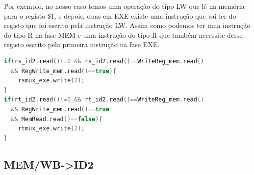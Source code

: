 \documentclass[pdftex,12pt,a4paper]{report}
\begin{document}
Por exemplo, no nosso caso temos uma operação do tipo LW que lê na memória para o registo \$1, e depois, duas em EXE existe uma instrução que vai ler do registo que foi escrito pela instrução LW. Assim como podemos ter uma instrução do tipo R na fase MEM e uma instrução do tipo R que também necessite desse registo escrito pela primeira instrução na fase EXE. 

\begin{lstlisting}[language=c]
if(rs_id2.read()!=0 && rs_id2.read()==WriteReg_mem.read()
  && RegWrite_mem.read()==true){
    rsmux_exe.write(2);
}
if(rt_id2.read()!=0 && rt_id2.read()==WriteReg_mem.read() 
  && RegWrite_mem.read()==true 
  && MemRead.read()==false){
    rtmux_exe.write(2);
}
\end{lstlisting} 

\subsection{MEM/WB->ID2}

\begin{table}[!htb]
\centering
\label{my-label}
\end{table}
\end{document}
